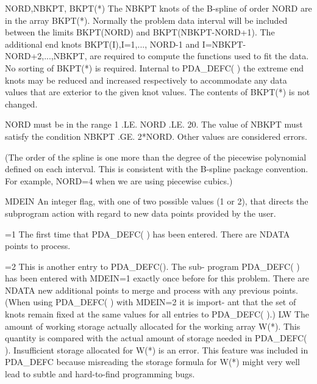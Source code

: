 \documentclass[11pt,twoside,nolof]{starlink}
\begin{document}
\begin{terminalv}
      NORD,NBKPT,
      BKPT(*)
                         The NBKPT knots of the B-spline of order NORD
                         are in the array BKPT(*).  Normally the
                         problem data interval will be included between
                         the limits BKPT(NORD) and BKPT(NBKPT-NORD+1).
                         The additional end knots BKPT(I),I=1,...,
                         NORD-1 and I=NBKPT-NORD+2,...,NBKPT, are
                         required to compute the functions used to fit
                         the data.  No sorting of BKPT(*) is required.
                         Internal to PDA_DEFC( ) the extreme end knots may
                         be reduced and increased respectively to
                         accommodate any data values that are exterior
                         to the given knot values.  The contents of
                         BKPT(*) is not changed.

                         NORD must be in the range 1 .LE. NORD .LE. 20.
                         The value of NBKPT must satisfy the condition
                         NBKPT .GE. 2*NORD.
                         Other values are considered errors.

                         (The order of the spline is one more than the
                         degree of the piecewise polynomial defined on
                         each interval.  This is consistent with the
                         B-spline package convention.  For example,
                         NORD=4 when we are using piecewise cubics.)

        MDEIN
                         An integer flag, with one of two possible
                         values (1 or 2), that directs the subprogram
                         action with regard to new data points provided
                         by the user.

                         =1  The first time that PDA_DEFC( ) has been
                         entered.  There are NDATA points to process.

                         =2  This is another entry to PDA_DEFC().  The sub-
                         program PDA_DEFC( ) has been entered with MDEIN=1
                         exactly once before for this problem.  There
                         are NDATA new additional points to merge and
                         process with any previous points.
                         (When using PDA_DEFC( ) with MDEIN=2 it is import-
                         ant that the set of knots remain fixed at the
                         same values for all entries to PDA_DEFC( ).)
       LW
                         The amount of working storage actually
                         allocated for the working array W(*).
                         This quantity is compared with the
                         actual amount of storage needed in PDA_DEFC( ).
                         Insufficient storage allocated for W(*) is
                         an error.  This feature was included in PDA_DEFC
                         because misreading the storage formula
                         for W(*) might very well lead to subtle
                         and hard-to-find programming bugs.


\end{terminalv}
\end{document}
